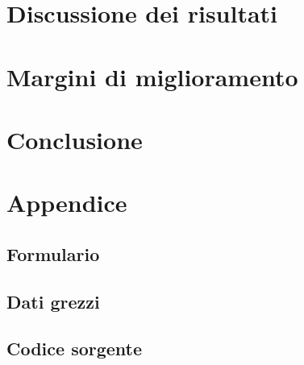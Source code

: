 \documentclass[a4paper,11pt,oneside]{article}
\begin{document}
\section{Discussione dei risultati}
\section{Margini di miglioramento}
\section{Conclusione}
\newpage
\section{Appendice}
\subsection{Formulario}
\subsection{Dati grezzi}
\subsection{Codice sorgente}
\end{document}
